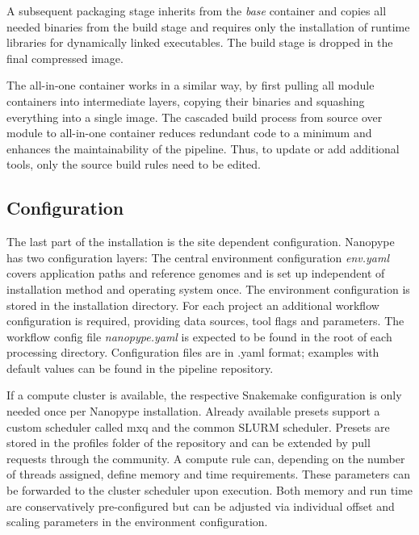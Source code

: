

A subsequent packaging stage inherits from the \textit{base} container and copies all needed binaries from the build stage and requires only the installation of runtime libraries for dynamically linked executables. The build stage is dropped in the final compressed image. 

The all-in-one container works in a similar way, by first pulling all module containers into intermediate layers, copying their binaries and squashing everything into a single image. The cascaded build process from source over module to all-in-one container reduces redundant code to a minimum and enhances the maintainability of the pipeline. Thus, to update or add additional tools, only the source build rules need to be edited.


\subsection{Configuration}

The last part of the installation is the site dependent configuration. Nanopype has two configuration layers: The central environment configuration \textit{env.yaml} covers application paths and reference genomes and is set up independent of installation method and operating system once. The environment configuration is stored in the installation directory. For each project an additional workflow configuration is required, providing data sources, tool flags and parameters. The workflow config file \textit{nanopype.yaml} is expected to be found in the root of each processing directory. Configuration files are in .yaml format; examples with default values can be found in the pipeline repository.

If a compute cluster is available, the respective Snakemake configuration is only needed once per Nanopype installation. Already available presets support a custom scheduler called mxq and the common SLURM scheduler. Presets are stored in the profiles folder of the repository and can be extended by pull requests through the community. A compute rule can, depending on the number of threads assigned, define memory and time requirements. These parameters can be forwarded to the cluster scheduler upon execution. Both memory and run time are conservatively pre-configured but can be adjusted via individual offset and scaling parameters in the environment configuration. 

